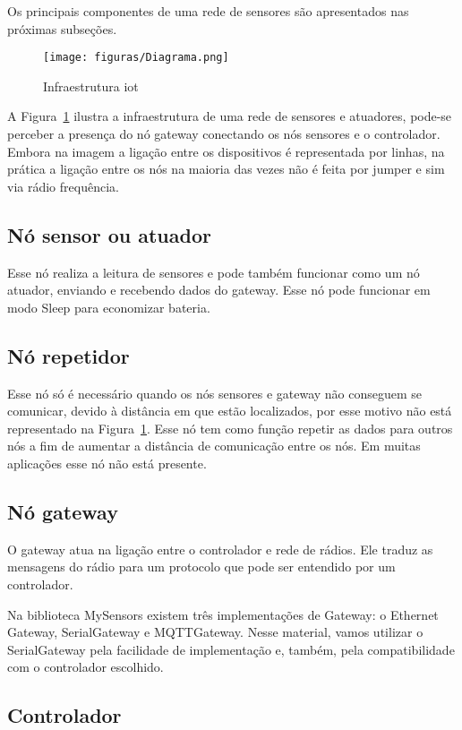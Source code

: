Os principais componentes de uma rede de sensores são apresentados nas próximas subseções.

\begin{figure}[H]
      \centering
      \texttt{[image: figuras/Diagrama.png]}
      \caption{Infraestrutura iot}
      \label{fig:iot}
\end{figure}

A Figura~\ref{fig:iot} ilustra a infraestrutura de uma rede de sensores e atuadores, pode-se perceber a presença do nó gateway conectando os nós sensores e o controlador. Embora na imagem a ligação entre os dispositivos é representada por linhas, na prática a ligação entre os nós na maioria das vezes não é feita por jumper e sim via rádio frequência. 

\subsection{Nó sensor ou atuador}
	Esse nó realiza a leitura de sensores e pode também funcionar como um nó atuador, enviando e recebendo dados do gateway. Esse nó pode funcionar em modo Sleep para economizar bateria.

\subsection{Nó repetidor}
	Esse nó só é necessário quando os nós sensores e gateway não conseguem se comunicar, devido à distância em que estão localizados, por esse motivo não está representado na Figura~\ref{fig:iot}. Esse nó tem como função repetir as dados para outros nós a fim de aumentar a distância de comunicação entre os nós. Em muitas aplicações esse nó não está presente.

\subsection{Nó gateway}

O gateway atua na ligação entre o controlador e rede de rádios. Ele traduz as mensagens do rádio para um protocolo que pode ser entendido por um controlador. 

Na biblioteca MySensors existem três implementações de Gateway: o Ethernet Gateway, SerialGateway e MQTTGateway. Nesse material, vamos utilizar o SerialGateway pela facilidade de implementação e, também, pela compatibilidade com o controlador escolhido.
	
\subsection{Controlador}

